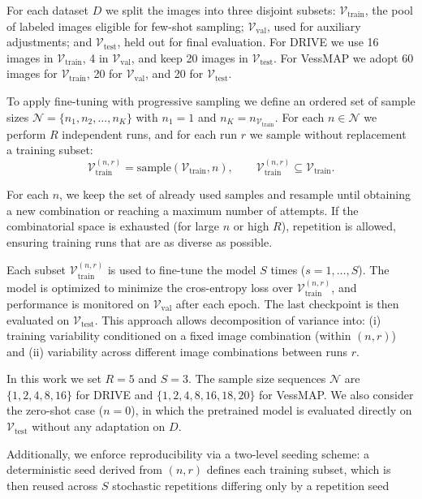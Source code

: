\documentclass[%
reprint,
nofootinbib,
 amsmath,amssymb,
aps,
superscriptaddress,
showkeys,
longbibliography
]{revtex4-1}
\begin{document}
For each dataset $D$ we split the images into three disjoint subsets: $\mathcal{V}_{\text{train}}$, the pool of labeled images eligible for few-shot sampling; $\mathcal{V}_{\text{val}}$, used for auxiliary adjustments; and $\mathcal{V}_{\text{test}}$, held out for final evaluation. For DRIVE we use 16 images in $\mathcal{V}_{\text{train}}$, 4 in $\mathcal{V}_{\text{val}}$, and keep 20 images in $\mathcal{V}_{\text{test}}$. For VessMAP we adopt 60 images for $\mathcal{V}_{\text{train}}$, 20 for $\mathcal{V}_{\text{val}}$, and 20 for $\mathcal{V}_{\text{test}}$.

To apply fine-tuning with progressive sampling we define an ordered set of sample sizes $\mathcal{N} = \{ n_1, n_2, \ldots, n_K \}$ with $n_1 = 1$ and $n_K = n_{\mathcal{V}_{\text{train}}}$. For each $n \in \mathcal{N}$ we perform $R$ independent runs, and for each run $r$ we sample without replacement a training subset:
\[
\mathcal{V}^{(n,r)}_{\text{train}} = \text{sample}(\mathcal{V}_{\text{train}}, n), \qquad \mathcal{V}^{(n,r)}_{\text{train}} \subseteq \mathcal{V}_{\text{train}}.
\]

For each $n$, we keep the set of already used samples and resample until obtaining a new combination or reaching a maximum number of attempts. If the combinatorial space is exhausted (for large $n$ or high $R$), repetition is allowed, ensuring training runs that are as diverse as possible.

Each subset $\mathcal{V}^{(n,r)}_{\text{train}}$ is used to fine-tune the model $S$ times ($s=1,\ldots,S$). The model is optimized to minimize the cros-entropy loss over $\mathcal{V}^{(n,r)}_{\text{train}}$, and performance is monitored on $\mathcal{V}_{\text{val}}$ after each epoch. The last checkpoint is then evaluated on $\mathcal{V}_{\text{test}}$. This approach allows decomposition of variance into: (i) training variability conditioned on a fixed image combination (within $(n,r)$) and (ii) variability across different image combinations between runs $r$.

In this work we set $R=5$ and $S=3$. The sample size sequences $\mathcal{N}$ are $\{1,2,4,8,16\}$ for DRIVE and $\{1,2,4,8,16,18,20\}$ for VessMAP. We also consider the zero-shot case ($n=0$), in which the pretrained model is evaluated directly on $\mathcal{V}_{\text{test}}$ without any adaptation on $D$. 

Additionally, we enforce reproducibility via a two-level seeding scheme: a deterministic seed derived from $(n,r)$ defines each training subset, which is then reused across $S$ stochastic repetitions differing only by a repetition seed
\end{document}
